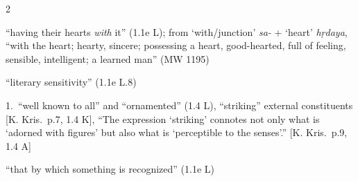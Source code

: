 \documentclass[10pt]{article}
\begin{document}
\begin{multicols}{2}
\begin{enumerate}[
			leftmargin=0em,
			rightmargin=0em,
		]
		 ``having their hearts \textit{with} it'' (1.1e L);
		from `with/junction' \textit{sa-} + `heart' \textit{hṛdaya},
		``with the heart; hearty, sincere; possessing a heart, good-hearted, full of feeling, sensible, intelligent; a learned man'' (MW 1195)
		
		 ``literary sensitivity'' (1.1e L.8)


		 1.\ ``well known to all'' and ``ornamented'' (1.4 L),
		``striking'' external constituents [K. Kris.\ p.7, 1.4 K],
		``The expression `striking' connotes not only what is `adorned with figures' but also what is `perceptible to the senses'.'' [K. Kris.\ p.9, 1.4 A]

		 ``that by which something is recognized'' (1.1e L)


\end{enumerate}
\end{multicols}
\end{document}
